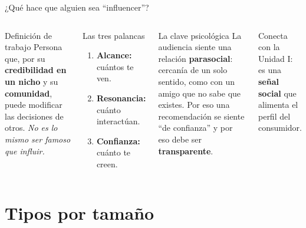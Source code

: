 \documentclass[aspectratio=169,xcolor=dvipsnames]{beamer}
\begin{document}
\begin{frame}{¿Qué hace que alguien sea \enquote{influencer}?}
\begin{columns}[T]
  \begin{block}{Definición de trabajo}
    \small Persona que, por su \textbf{credibilidad en un nicho} y su \textbf{comunidad}, puede modificar las decisiones de otros. \emph{No es lo mismo ser famoso que influir.}
  \end{block}
  \begin{exampleblock}{Las tres palancas}
    \small
    \begin{enumerate}
      \item \textbf{Alcance:} cuántos te ven.
      \item \textbf{Resonancia:} cuánto interactúan.
      \item \textbf{Confianza:} cuánto te creen.
    \end{enumerate}
  \end{exampleblock}
  \begin{alertblock}{La clave psicológica}
    \small La audiencia siente una relación \textbf{parasocial}: cercanía de un solo sentido, como con un amigo que no sabe que existes. Por eso una recomendación se siente \enquote{de confianza} y por eso debe ser \textbf{transparente}.
  \end{alertblock}
  \small Conecta con la Unidad I: es una \textbf{señal social} que alimenta el perfil del consumidor.
\end{columns}
\end{frame}

\section[Por tamaño]{Tipos por tamaño}
\end{document}

